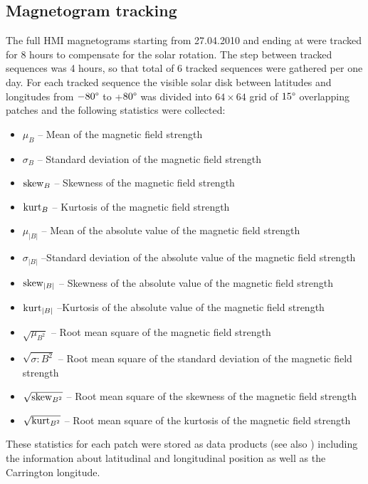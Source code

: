 \documentclass{aa}
\begin{document}
\subsection{Magnetogram tracking}
The full HMI magnetograms starting from 27.04.2010 and ending at  were tracked for 8 hours to compensate for the solar rotation. The step between tracked sequences was 4 hours, so that total of 6 tracked sequences were gathered per one day. For each tracked sequence the visible solar disk between latitudes and longitudes from $-80\degree$ to +$80\degree$ was divided into $64\times 64$ grid of $15\degree$ overlapping patches and the following statistics were collected:
\begin{itemize}
	\item $\mu_B$ -- Mean of the magnetic field strength
	\item $\sigma_B$ -- Standard deviation of the magnetic field strength
	\item ${\rm skew}_B$ -- Skewness of the magnetic field strength
	\item ${\rm kurt}_B$ -- Kurtosis of the magnetic field strength
	\item $\mu_{|B|}$ -- Mean of the absolute value of the magnetic field strength
    \item $\sigma_{|B|}$ --Standard deviation of the absolute value of the magnetic field strength
    \item ${\rm skew}_{|B|}$ -- Skewness of the absolute value of the magnetic field strength
    \item ${\rm kurt}_{|B|}$ --Kurtosis of the absolute value of the magnetic field strength
	\item $\sqrt{\mu_{B^2}}$ -- Root mean square of the magnetic field strength
    \item $\sqrt{\sigma:{B^2}}$ -- Root mean square of the standard deviation of the magnetic field strength
    \item $\sqrt{{\rm skew}_{B^2}}$ -- Root mean square of the skewness of the magnetic field strength
    \item $\sqrt{{\rm kurt}_{B^2}}$ -- Root mean square of the kurtosis of the magnetic field strength
\end{itemize}
These statistics for each patch were stored as data products (see also ) including the information about latitudinal and longitudinal position as well as the Carrington longitude.

\end{document}
